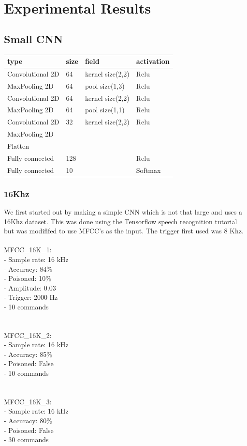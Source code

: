 \documentclass{article}
\theoremstyle{definition}
\theoremstyle{remark}
\begin{document}
\section{Experimental Results}

\subsection{Small CNN}

\begin{table}[]
\begin{tabular}{llll}
\hline
type & size & field & activation \\ \hline
Convolutional 2D & 64 & kernel size(2,2) & Relu \\
MaxPooling 2D & 64 & pool size(1,3) & Relu \\
Convolutional 2D & 64 & kernel size(2,2) & Relu \\
MaxPooling 2D & 64 & pool size(1,1) & Relu \\
Convolutional 2D & 32 & kernel size(2,2) & Relu \\
MaxPooling 2D & & &  \\
Flatten & & &  \\
Fully connected & 128 & & Relu  \\
Fully connected & 10 & & Softmax \\ \hline
\end{tabular}
\end{table}

\subsubsection{16Khz}
We first started out by making a simple CNN which is not that large and uses a 16Khz dataset. This was done using the Tensorflow speech recognition tutorial but was modififed to use MFCC's as the input. The trigger first used was 8 Khz. \\\\
MFCC\_16K\_1:\\
- Sample rate: 16 kHz\\
- Accuracy: 84\% \\
- Poisoned: 10\% \\
- Amplitude: 0.03 \\
- Trigger: 2000 Hz \\
- 10 commands \\
\\\\
MFCC\_16K\_2:\\
- Sample rate: 16 kHz \\
- Accuracy: 85\%\\ 
- Poisoned: False\\
- 10 commands\\
\\\\
MFCC\_16K\_3:\\
- Sample rate: 16 kHz\\
- Accuracy: 80\%\\ 
- Poisoned: False\\
- 30 commands\\
\end{document}
